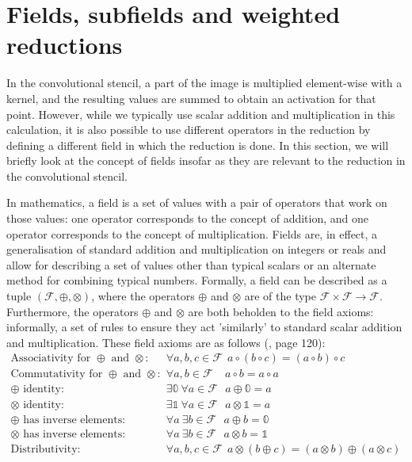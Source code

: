 \documentclass[a4paper, 12pt]{report}
\begin{document}
\section{Fields, subfields and weighted reductions}
In the convolutional stencil, a part of the image is multiplied element-wise with a kernel, and the resulting values are summed to obtain an activation for that point. However, while we typically use scalar addition and multiplication in this calculation, it is also possible to use different operators in the reduction by defining a different field in which the reduction is done. In this section, we will briefly look at the concept of fields insofar as they are relevant to the reduction in the convolutional stencil.

In mathematics, a field is a set of values with a pair of operators that work on those values: one operator corresponds to the concept of addition, and one operator corresponds to the concept of multiplication. Fields are, in effect, a generalisation of standard addition and multiplication on integers or reals and allow for describing a set of values other than typical scalars or an alternate method for combining typical numbers. Formally, a field can be described as a tuple $(\mathcal{F}, \oplus, \otimes)$, where the operators $\oplus$ and $\otimes$ are of the type $\mathcal{F}\times\mathcal{F}\rightarrow\mathcal{F}$. Furthermore, the operators $\oplus$ and $\otimes$ are both beholden to the field axioms: informally, a set of rules to ensure they act 'similarly' to standard scalar addition and multiplication. These field axioms are as follows (\cite{beachy2006abstract}, page 120):
\begin{align}
\textrm{Associativity for $\oplus$ and $\otimes$: }&\forall a,b,c\in \mathcal{F}~~  a \circ (b \circ c) = (a\circ b) \circ c \\ 
\textrm{Commutativity for $\oplus$ and $\otimes$: }&\forall a,b\in \mathcal{F}~~~~~ a\circ b = a  \circ a \\
\oplus\textrm{ identity: }& \exists \mathbb{0}~\forall a\in \mathcal{F}~~~ a\oplus \mathbb{0} = a \\ 
\otimes\textrm{ identity: }& \exists \mathbb{1}~\forall a\in \mathcal{F}~~~ a\otimes \mathbb{1} = a \\ 
\oplus\textrm{ has inverse elements: }& \forall a~\exists b\in \mathcal{F}~~~ a\oplus b = \mathbb{0}  \\ 
\otimes\textrm{ has inverse elements: }& \forall a~\exists b\in \mathcal{F}~~~ a\otimes b = \mathbb{1}  \\ 
\textrm{Distributivity: }&\forall a,b,c\in \mathcal{F}~~ a\otimes (b \oplus c) = (a\otimes b)\oplus(a\otimes c)
\end{align}
\end{document}
